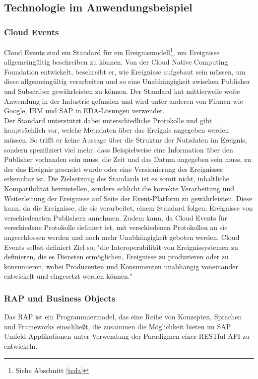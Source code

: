 \subsection{Technologie im Anwendungsbeispiel}

\subsubsection*{Cloud Events}
\label{cloudev}
Cloud Events sind ein Standard für ein Ereignismodell\footnote{Siehe Abschnitt \ref*{teda}}, um Ereignisse allgemeingültig beschreiben zu können. Von der Cloud Native Computing Foundation entwickelt, beschreibt er, wie Ereignisse aufgebaut sein müssen, um diese allgemeingültig verarbeiten und so eine Unabhängigkeit zwischen Publisher und Subscriber gewährleisten zu können. Der Standard hat mittlerweile weite Anwendung in der Industrie gefunden und wird unter anderen von Firmen wie Google, IBM und SAP in \ac{EDA}-Lösungen verwendet. \cite[Vgl. ]{cloudevent} \\
Der Standard unterstützt dabei unterschiedliche Protokolle und gibt hauptsächlich vor, welche Metadaten über das Ereignis angegeben werden müssen. So trifft er keine Aussage über die Struktur der Nutzdaten im Ereignis, sondern spezifiziert viel mehr, dass Beispielweise eine Information über den Publisher vorhanden sein muss, die Zeit und das Datum angegeben sein muss, zu der das Ereignis gesendet wurde oder eine Versionierung des Ereignisses erkennbar ist. Die Zielsetzung des Standards ist es somit nicht, inhaltliche Kompatibilität herzustellen, sondern schlicht die korrekte Verarbeitung und Weiterleitung der Ereignisse auf Seite der Event-Platform zu gewährleisten. Diese kann, da die Ereignisse, die sie verarbeitet, einem Standard folgen, Ereignisse von verschiedensten Publishern annehmen. Zudem kann, da Cloud Events für verschiedene Protokolle definiert ist, mit verschiedenen Protokollen an sie angeschlossen werden und noch mehr Unabhängigkeit geboten werden. Cloud Events selbst definiert Ziel so, "die Interoperabilität von Ereignissystemen zu definieren, die es Diensten ermöglichen, Ereignisse zu produzieren oder zu konsumieren, wobei Produzenten und Konsumenten unabhängig voneinander entwickelt und eingesetzt werden können."\cite[Vgl. ]{cloudeventprimer}

\subsubsection*{RAP und Business Objects}
Das \ac{RAP} ist ein Programmiermodel, das eine Reihe von Konzepten, Sprachen und Frameworks einschließt, die zusammen die Möglichkeit bieten im SAP Umfeld Applikationen unter Verwendung der Paradigmen einer \ac*{REST}ful \ac{API} zu entwickeln. \citepls

